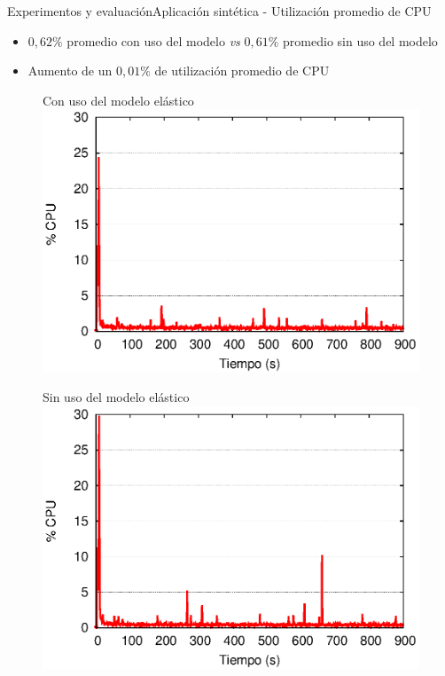 
\begin{frame}{Experimentos y evaluación}{Aplicación sintética - Utilización promedio de CPU}

\begin{itemize}
\item $0,62\%$ promedio con uso del modelo \textit{vs} $0,61\%$ promedio sin uso del modelo
\item Aumento de un $0,01\%$ de utilización promedio de CPU
\end{itemize}

\begin{multicols}{2}
\begin{figure}[p]
	\centering
	{\scriptsize Con uso del modelo elástico\\}
	\includegraphics[scale=0.475]{images/exp/app3/cm/fisical/consumeCPU.eps}
\end{figure}

\begin{figure}[p]
	\centering
	{\scriptsize Sin uso del modelo elástico\\}
	\includegraphics[scale=0.475]{images/exp/app3/sm/fisical/consumeCPU.eps}
\end{figure}
\end{multicols}
\end{frame}

